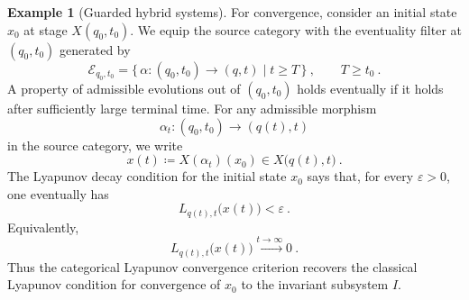 \documentclass[a4paper,reqno,oneside]{amsart}
\theoremstyle{definition}
\newtheorem{example}[theorem]{Example}
\theoremstyle{remark}
\numberwithin{equation}{section}
\begin{document}
\begin{example}[Guarded hybrid systems]
For convergence, consider an initial state $x_0$ at stage $X(q_0,t_0)$. We equip the source category with the eventuality filter at
$(q_0,t_0)$ generated by
\begin{equation}
    \mathcal E_{q_0,t_0}
    =
    \{\,\alpha\colon (q_0,t_0)\to(q,t)
        \mid t\geq T\,\} \ ,
    \qquad T\geq t_0 \ .
\end{equation}
A property of admissible evolutions out of $(q_0,t_0)$ holds
eventually if it holds after sufficiently large terminal time. For any admissible morphism
\begin{equation}
    \alpha_t \colon (q_0,t_0)\to (q(t),t)
\end{equation}
in the source category, we write
\begin{equation}
    x(t)
    \coloneqq
    X(\alpha_t)(x_0)
    \in
    X\big(q(t),t\big) \ .
\end{equation}
The Lyapunov decay condition for the initial state $x_0$ says that, for
every $\varepsilon>0$, one eventually has
\begin{equation}
    L_{q(t),t}\big(x(t)\big)<\varepsilon \ .
\end{equation}
Equivalently,
\begin{equation}
    L_{q(t),t}\big(x(t)\big)\xrightarrow{t \to \infty} 0 \ .
\end{equation}
Thus the categorical Lyapunov convergence
criterion recovers the classical Lyapunov condition for convergence of $x_0$ to the invariant subsystem $I$.
\end{example}
	
	
	
\end{document}
